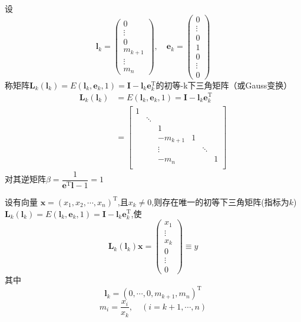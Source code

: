 \begin{definition}
    设
    \[
        \boldsymbol{l}_k=
        \begin{pmatrix}
            0\\\vdots\\0\\m_{k+1}\\\vdots\\m_n
        \end{pmatrix}
        ,\quad 
        \boldsymbol{e}_k=
        \begin{pmatrix}
            0\\\vdots\\0\\1\\0\\\vdots\\0
        \end{pmatrix} 
    \]
    称矩阵$\boldsymbol{L}_{k}(\boldsymbol{l}_{k}) = E(\boldsymbol{l}_k,\boldsymbol{e}_k,1) = \boldsymbol{I}-\boldsymbol{l}_{k}\boldsymbol{e}_k^{\mathrm{T}}$的初等-k下三角矩阵（或Gauss变换）
    \[
        \begin{aligned}
            \boldsymbol{L}_{k}(\boldsymbol{l}_{k}) &= E(\boldsymbol{l}_k,\boldsymbol{e}_k,1) = \boldsymbol{I}-\boldsymbol{l}_{k}\boldsymbol{e}_k^{\mathrm{T}}\\
            &=\begin{bmatrix}
                1   &     &     &     &     &  \\
                & \ddots &     &     &     &  \\
                &     & 1   &     &     &  \\
                &     & -m_{k+1} & 1   &     &  \\
                &     & \vdots &     & \ddots &  \\
                &     & -m_{n} &     &     & 1 \\
            \end{bmatrix}
        \end{aligned}
    \]
    对其逆矩阵$\beta = \dfrac{1}{\boldsymbol{e}^{\mathrm{T}}\boldsymbol{l}-1} = 1$
\end{definition}
\begin{theorem}
    设有向量 $\boldsymbol{x}=(x_1,x_2,\cdots,x_n)^{\mathrm{T}}$,且$x_k\neq 0$,则存在唯一的初等下三角矩阵(指标为$k$)$\boldsymbol{L}_{k}(\boldsymbol{l}_{k}) = E(\boldsymbol{l}_k,\boldsymbol{e}_k,1) = \boldsymbol{I}-\boldsymbol{l}_{k}\boldsymbol{e}_k^{\mathrm{T}}$,使
    \[
        \boldsymbol{L}_k(\boldsymbol{l}_{k})\boldsymbol{x}=
        \begin{pmatrix}
            x_1\\\vdots\\x_k\\0\\\vdots\\0
        \end{pmatrix}\equiv y
    \]
    其中
    \[
        \boldsymbol{l}_{k} = \left( 0,\cdots,0,m_{k+1},m_{n} \right)^{\mathrm{T}}
    \]
    \[
        m_{i} = \dfrac{x_{i}}{x_{k}},\quad \left( i = k+1,\cdots,n \right)
    \]
\end{theorem}
